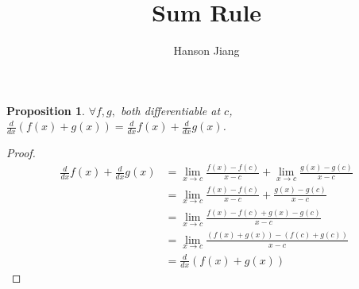 \documentclass[12pt]{article}
\newtheorem{proposition}{Proposition}
\newcommand{\ddx}{\frac{d}{dx}}
\begin{document}
\title{Sum Rule}
\author{Hanson Jiang}
\maketitle

\begin{proposition}
  $\forall f, g,$ both differentiable at $c$,
  $\ddx (f(x)+g(x)) = \ddx f(x) + \ddx g(x)$.

\end{proposition}

\begin{proof}
  \begin{align*}
    \ddx f(x) + \ddx g(x)
    &= \lim_{x\rightarrow c} \frac{f(x)-f(c)}{x-c}
    + \lim_{x\rightarrow c} \frac{g(x)-g(c)}{x-c} \\
    &= \lim_{x\rightarrow c} \frac{f(x)-f(c)}{x-c} + \frac{g(x)-g(c)}{x-c} \\
    &= \lim_{x\rightarrow c} \frac{f(x)-f(c) + g(x)-g (c)}{x-c} \\
    &= \lim_{x\rightarrow c} \frac{(f(x)+g(x)) - (f(c)+g (c))}{x-c} \\
    &= \ddx (f(x)+g(x))
  \end{align*}
\end{proof}
\end{document}
